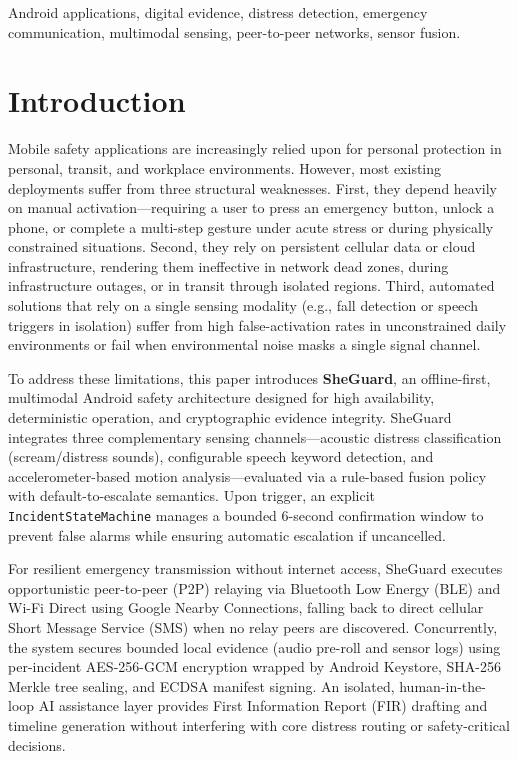 \documentclass[conference]{IEEEtran}
\begin{document}
\begin{IEEEkeywords}
Android applications, digital evidence, distress detection, emergency communication, multimodal sensing, peer-to-peer networks, sensor fusion.
\end{IEEEkeywords}

\section{Introduction}
Mobile safety applications are increasingly relied upon for personal protection in personal, transit, and workplace environments. However, most existing deployments suffer from three structural weaknesses. First, they depend heavily on manual activation---requiring a user to press an emergency button, unlock a phone, or complete a multi-step gesture under acute stress or during physically constrained situations. Second, they rely on persistent cellular data or cloud infrastructure, rendering them ineffective in network dead zones, during infrastructure outages, or in transit through isolated regions. Third, automated solutions that rely on a single sensing modality (e.g., fall detection or speech triggers in isolation) suffer from high false-activation rates in unconstrained daily environments or fail when environmental noise masks a single signal channel.

To address these limitations, this paper introduces \textbf{SheGuard}, an offline-first, multimodal Android safety architecture designed for high availability, deterministic operation, and cryptographic evidence integrity. SheGuard integrates three complementary sensing channels---acoustic distress classification (scream/distress sounds), configurable speech keyword detection, and accelerometer-based motion analysis---evaluated via a rule-based fusion policy with default-to-escalate semantics. Upon trigger, an explicit \texttt{IncidentStateMachine} manages a bounded 6-second confirmation window to prevent false alarms while ensuring automatic escalation if uncancelled.

For resilient emergency transmission without internet access, SheGuard executes opportunistic peer-to-peer (P2P) relaying via Bluetooth Low Energy (BLE) and Wi-Fi Direct using Google Nearby Connections, falling back to direct cellular Short Message Service (SMS) when no relay peers are discovered. Concurrently, the system secures bounded local evidence (audio pre-roll and sensor logs) using per-incident AES-256-GCM encryption wrapped by Android Keystore, SHA-256 Merkle tree sealing, and ECDSA manifest signing. An isolated, human-in-the-loop AI assistance layer provides First Information Report (FIR) drafting and timeline generation without interfering with core distress routing or safety-critical decisions.
\end{document}

